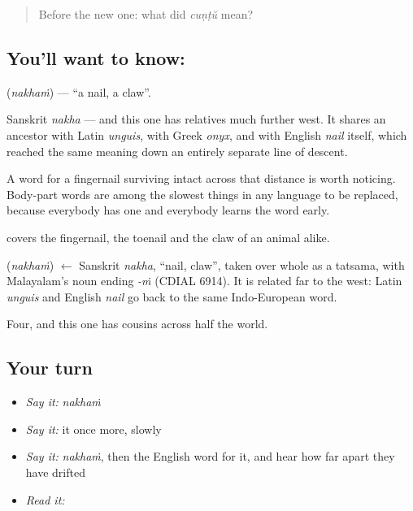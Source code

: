 \begin{quote}
Before the new one: what did \emph{cuṇṭŭ} mean?
\end{quote}

\subsection*{You'll want to know: }
\textbf{} (\emph{nakhaṁ}) — \textquotedblleft{}a nail, a claw\textquotedblright{}.

Sanskrit \emph{nakha} — and this one has relatives much further west. It shares an ancestor with Latin \emph{unguis}, with Greek \emph{onyx}, and with English \emph{nail} itself, which reached the same meaning down an entirely separate line of descent.

A word for a fingernail surviving intact across that distance is worth noticing. Body-part words are among the slowest things in any language to be replaced, because everybody has one and everybody learns the word early.

 covers the fingernail, the toenail and the claw of an animal alike.

\begin{cousinweb}
\textbf{} (\emph{nakhaṁ}) $\leftarrow$ Sanskrit \emph{nakha}, \textquotedblleft{}nail, claw\textquotedblright{}, taken over whole as a tatsama, with Malayalam's noun ending \emph{-ṁ} (CDIAL 6914). It is related far to the west: Latin \emph{unguis} and English \emph{nail} go back to the same Indo-European word.
\end{cousinweb}

\begin{grammarlens}[title={What you've built}]
Four, and this one has cousins across half the world.
\end{grammarlens}

\subsection*{Your turn}
\begin{itemize}
\raggedright
  \item \emph{Say it:} \emph{nakhaṁ}
  \item \emph{Say it:} it once more, slowly
  \item \emph{Say it:} \emph{nakhaṁ}, then the English word for it, and hear how far apart they have drifted
  \item \emph{Read it:} \textbf{}
\end{itemize}

